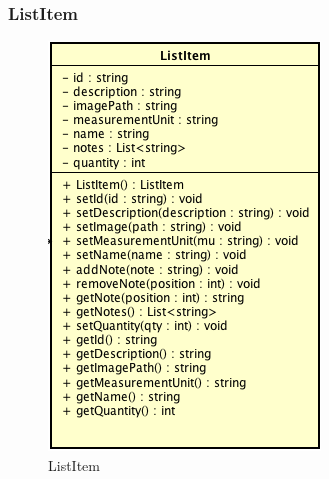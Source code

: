 \subsubsection{ListItem}

\label{ListItem}
\begin{figure}[ht]
	\centering
	\includegraphics[scale=0.5]{Sezioni/SottosezioniST/img/app/ListItem.png}
	\caption{ListItem}
\end{figure}

